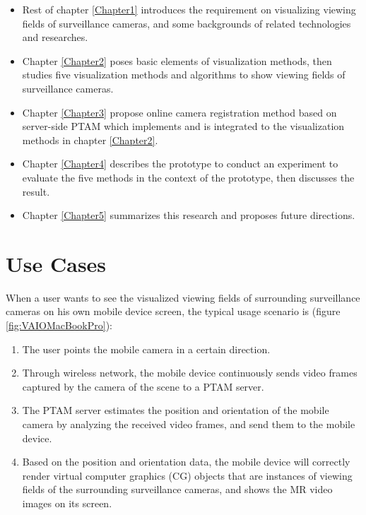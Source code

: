 \begin{itemize}
	\item Rest of chapter \ref{Chapter1} introduces the requirement on visualizing viewing fields of surveillance cameras, and some backgrounds of related technologies and researches.
	\item Chapter \ref{Chapter2} poses basic elements of visualization methods, then studies five visualization methods and algorithms to show viewing fields of surveillance cameras.
	\item Chapter \ref{Chapter3} propose online camera registration method based on server-side PTAM which implements and is integrated to the visualization methods in chapter \ref{Chapter2}.
	\item Chapter \ref{Chapter4} describes the prototype to conduct an experiment to evaluate the five methods in the context of the prototype, then discusses the result.
	\item Chapter \ref{Chapter5} summarizes this research and proposes future directions.
\end{itemize}


\section{Use Cases}
\label{UseCases}

When a user wants to see the visualized viewing fields of surrounding surveillance cameras on his own mobile device screen, the typical usage scenario is (figure \ref{fig:VAIOMacBookPro}):

\begin{enumerate}
	\item The user points the mobile camera in a certain direction.
	\item Through wireless network, the mobile device continuously sends video frames captured by the camera of the scene to a PTAM server.
	\item The PTAM server estimates the position and orientation of the mobile camera by analyzing the received video frames, and send them to the mobile device.
	\item Based on the position and orientation data, the mobile device will correctly render virtual computer graphics (CG) objects that are instances of viewing fields of the surrounding surveillance cameras, and shows the MR video images on its screen.
\end{enumerate}

